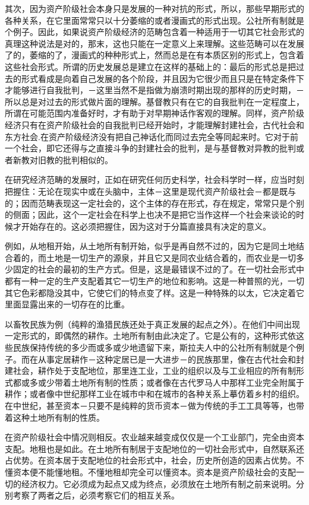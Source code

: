 \documentclass[a4paper,twoside,12pt,AutoFakeBold]{ctexart}
\begin{document}
其次，因为资产阶级社会本身只是发展的一种对抗的形式，所以，那些早期形式的各种关系，在它里面常常只以十分萎缩的或者漫画式的形式出现。公社所有制就是个例子。因此，如果说资产阶级经济的范畴包含着一种适用于一切其它社会形式的真理这种说法是对的，那末，这也只能在一定意义上来理解。这些范畴可以在发展了的，萎缩的了，漫画式的种种形式上，然而总是在有本质区别的形式上，包含着这些社会形式。所谓的历史发展总是建立在这样的基础上的：最后的形式总是把过去的形式看成是向着自己发展的各个阶段，并且因为它很少而且只是在特定条件下才能够进行自我批判，－这里当然不是指做为崩溃时期出现的那样的历史时期，－所以总是对过去的形式做片面的理解。基督教只有在它的自我批判在一定程度上，所谓在可能范围内准备好时，才有助于对早期神话作客观的理解。同样，资产阶级经济只有在资产阶级社会的自我批判已经开始时，才能理解封建社会，古代社会和东方社会.在资产阶级经济没有把自己神话化而同过去完全等同起来时。它对于前一个社会，即它还得与之直接斗争的封建社会的批判，是与基督教对异教的批判或者新教对旧教的批判相似的。

在研究经济范畴的发展时，正如在研究任何历史科学，社会科学时一样，应当时刻把握住：无论在现实中或在头脑中，主体－这里是现代资产阶级社会－都是既与的；因而范畴表现这一定社会的，这个主体的存在形式，存在规定，常常只是个别的侧面；因此，这个一定社会在科学上也决不是把它当作这样一个社会来谈论的时候才开始存在的。这必须把握住，因为这对于分篇直接具有决定的意义。

例如，从地租开始，从土地所有制开始，似乎是再自然不过的，因为它是同土地结合着的，而土地是一切生产的源泉，并且它又是同农业结合着的，而农业是一切多少固定的社会的最初的生产方式。但是，这是最错误不过的了。在一切社会形式中都有一种一定的生产支配着其它一切生产的地位和影响。这是一种普照的光，一切其它色彩都隐没其中，它使它们的特点变了样。这是一种特殊的以太，它决定着它里面显露出来的一切存在的比重。

以畜牧民族为例（纯粹的渔猎民族还处于真正发展的起点之外）。在他们中间出现一定形式的，即偶然的耕作。土地所有制由此决定了。它是公有的，这种形式依这些民族保持传统的多少而或多或少地遗留下来，斯拉夫人中的公社所有制就是个例子。而在从事定居耕作－这种定居已是一大进步－的民族那里，像在古代社会和封建社会，耕作处于支配地位，那里连工业，工业的组织以及与工业相应的所有制形式都或多或少带着土地所有制的性质；或者像在古代罗马人中那样工业完全附属于耕作；或者像中世纪那样工业在城市中和在城市的各种关系上摹仿着乡村的组织。在中世纪，甚至资本－只要不是纯粹的货币资本－做为传统的手工工具等等，也带着这种土地所有制的性质。

在资产阶级社会中情况则相反。农业越来越变成仅仅是一个工业部门，完全由资本支配。地租也是如此。在土地所有制居于支配地位的一切社会形式中，自然联系还占优势。在资本居于支配地位的社会形式中，社会，历史所创造的因素占优势。不懂资本便不能懂地租。不懂地租却完全可以懂资本。资本是资产阶级社会的支配一切的经济权力。它必须成为起点又成为终点，必须放在土地所有制之前来说明。分别考察了两者之后，必须考察它们的相互关系。
\end{document}
